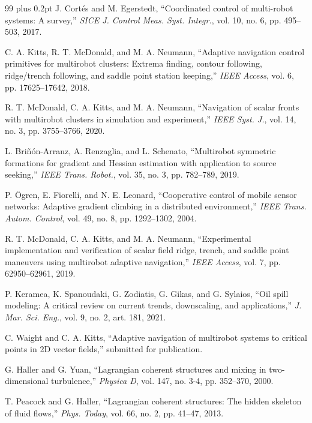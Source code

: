 \documentclass[lettersize,journal]{IEEEtran}
\begin{document}
\begin{thebibliography}{99}
\scriptsize
\itemsep 0pt plus 0.2pt
\parskip 0pt
 J. Cortés and M. Egerstedt, ``Coordinated control of multi-robot
systems: A survey,'' \textit{SICE J. Control Meas. Syst. Integr.},
vol. 10, no. 6, pp. 495--503, 2017.

 C. A. Kitts, R. T. McDonald, and M. A. Neumann, ``Adaptive
navigation control primitives for multirobot clusters: Extrema finding,
contour following, ridge/trench following, and saddle point station keeping,''
\textit{IEEE Access}, vol. 6, pp. 17625--17642, 2018.

 R. T. McDonald, C. A. Kitts, and M. A. Neumann, ``Navigation of
scalar fronts with multirobot clusters in simulation and experiment,''
\textit{IEEE Syst. J.}, vol. 14, no. 3, pp. 3755--3766, 2020.

 L. Briñón-Arranz, A. Renzaglia, and L. Schenato, ``Multirobot
symmetric formations for gradient and Hessian estimation with application to
source seeking,'' \textit{IEEE Trans. Robot.}, vol. 35, no. 3,
pp. 782--789, 2019.

 P. Ögren, E. Fiorelli, and N. E. Leonard, ``Cooperative control
of mobile sensor networks: Adaptive gradient climbing in a distributed
environment,'' \textit{IEEE Trans. Autom. Control}, vol. 49, no. 8,
pp. 1292--1302, 2004.

 R. T. McDonald, C. A. Kitts, and M. A. Neumann, ``Experimental
implementation and verification of scalar field ridge, trench, and saddle
point maneuvers using multirobot adaptive navigation,'' \textit{IEEE Access},
vol. 7, pp. 62950--62961, 2019.

 P. Keramea, K. Spanoudaki, G. Zodiatis, G. Gikas, and
G. Sylaios, ``Oil spill modeling: A critical review on current trends,
downscaling, and applications,'' \textit{J. Mar. Sci. Eng.}, vol. 9,
no. 2, art. 181, 2021.

 C. Waight and C. A. Kitts, ``Adaptive navigation of multirobot
systems to critical points in 2D vector fields,'' submitted for publication.

 G. Haller and G. Yuan, ``Lagrangian coherent structures and mixing
in two-dimensional turbulence,'' \textit{Physica D}, vol. 147, no. 3-4,
pp. 352--370, 2000.

 T. Peacock and G. Haller, ``Lagrangian coherent structures: The
hidden skeleton of fluid flows,'' \textit{Phys. Today}, vol. 66, no. 2,
pp. 41--47, 2013.


\end{thebibliography}
\end{document}
